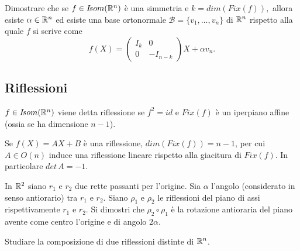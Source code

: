   \begin{exercise}
Dimostrare che se $f\in I\!som( \mathbb R^n)$ è una simmetria e
 $k=dim(Fix(f)),$ allora esiste $\alpha\in\mathbb R^n$ ed esiste una base ortonormale $\mathcal{B}=\{v_1,\ldots,v_n\}$ di $\mathbb R^n$ rispetto alla quale
 $f$ si scrive come
 \[
 f(X)=\left(
 \begin{array}{cc}
  I_k & 0\\
  0 & -I_{n-k}
 \end{array}
 \right)
 X+\alpha v_n.
 \]
 \end{exercise}
 

	\subsection{Riflessioni}
 
 \begin{definition}
	$f\in I\!som( \mathbb R^n )$ viene detta riflessione se $f^2=id$ e $Fix(f)$ 
	è un iperpiano affine (ossia se ha dimensione $n-1$).
 \end{definition}

 
 \begin{remark}
 Se $f(X)=AX+B$ è una riflessione, $dim(Fix(f))=n-1$, per cui
 $A\in O(n)$ induce una riflessione lineare rispetto alla giacitura di $Fix(f)$. In particolare $det\,A=-1$.
 \end{remark}
 
 \begin{exercise}
In $\mathbb R^2$ siano $r_1$ e $r_2$ due rette passanti per l'origine. Sia $\alpha$
 l'angolo (considerato in senso antiorario) tra $r_1$ e $r_2$. Siano $\rho_1$ e $\rho_2$
 le riflessioni del piano di assi rispettivamente $r_1$ e $r_2$.
 Si dimostri che $\rho_2\circ\rho_1$ è la rotazione antioraria del piano avente come centro l'origine e di angolo 
 $2\alpha$.
 \end{exercise}
 
 \begin{exercise}
 Studiare la composizione di due riflessioni distinte di $\mathbb R^n$.
 \end{exercise}
 
